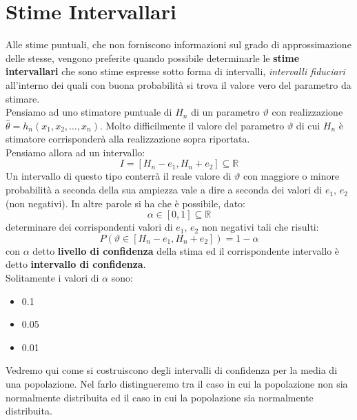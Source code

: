 \documentclass[a4paper,12pt, oneside]{book}
\newcommand{\numberset}{\mathbb}
\newcommand{\R}{\numberset{R}}
\begin{document}
\section{Stime Intervallari}
Alle stime puntuali, che non forniscono informazioni sul grado di approssimazione delle
stesse, vengono preferite quando possibile
determinarle le \textbf{stime intervallari} che sono stime espresse sotto forma di
intervalli, \textit{intervalli fiduciari} all’interno dei quali con buona probabilità si trova
il valore vero del parametro da stimare.\\
Pensiamo ad uno stimatore puntuale di $H_n$ di un parametro $\vartheta$ con realizzazione $\hat{\theta}=h_{n}\left(x_{1}, x_{2}, \ldots, x_{n}\right)$. Molto difficilmente il valore del parametro $\vartheta$ di cui $H_n$ è stimatore corrisponderà alla realizzazione sopra riportata.\\
Pensiamo allora ad un intervallo:
\[I=\left[H_{n}-e_{1}, H_{n}+e_{2}\right] \subseteq \R\]
Un intervallo di questo tipo conterrà il reale valore di $\vartheta$ con maggiore o minore
probabilità a seconda della sua ampiezza vale a dire a seconda dei valori di $e_1,\, e_2$ (non negativi). In altre parole si ha che è possibile, dato:
\[\alpha \in[0,1] \subseteq \R\]
determinare dei corrispondenti valori di $e_1,\,e_2$ non negativi tali che risulti:
\[P\left(\vartheta \in\left[H_{n}-e_{1}, H_{n}+e_{2}\right]\right)=1-\alpha\]
con $\alpha$ detto \textbf{livello di confidenza} della stima ed il corrispondente intervallo è detto \textbf{intervallo di confidenza}.\\
Solitamente i valori di $\alpha$ sono:
\begin{itemize}
\item 0.1
\item 0.05
\item 0.01  
\end{itemize}
Vedremo qui come si costruiscono degli intervalli di confidenza per la media di una
popolazione.
Nel farlo distingueremo tra il caso in cui la popolazione non sia normalmente
distribuita ed il caso in cui la popolazione sia normalmente distribuita.
\end{document}
